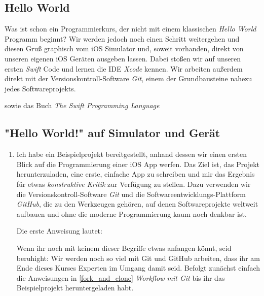 \documentclass[parskip=half, final]{scrreprt}
\begin{document}
\begin{lecture} %


\chapter{Hello World}

Was ist schon ein Programmierkurs, der nicht mit einem klassischen \emph{Hello World} Programm beginnt? Wir werden jedoch noch einen Schritt weitergehen und diesen Gruß graphisch vom iOS Simulator und, soweit vorhanden, direkt von unseren eigenen iOS Geräten ausgeben lassen. Dabei stoßen wir auf unseren ersten \emph{Swift} Code und lernen die IDE \emph{Xcode} kennen. Wir arbeiten außerdem direkt mit der Versionskontroll-Software \emph{Git}, einem der Grundbausteine nahezu jedes Softwareprojekts.

 sowie das Buch \emph{The Swift Programming Language} 


\section{"{}Hello World!"{} auf Simulator und Gerät}

\begin{enumerate}

\item Ich habe ein Beispielprojekt bereitgestellt, anhand dessen wir einen ersten Blick auf die Programmierung einer iOS App werfen. Das Ziel ist, das Projekt herunterzuladen, eine erste, einfache App zu schreiben und mir das Ergebnis für etwas \emph{konstruktive Kritik} zur Verfügung zu stellen. Dazu verwenden wir die Versionskontroll-Software \emph{Git} und die Softwareentwicklungs-Plattform \emph{GitHub}, die zu den Werkzeugen gehören, auf denen Softwareprojekte weltweit aufbauen und ohne die moderne Programmierung kaum noch denkbar ist.

Die erste Anweisung lautet:


Wenn ihr noch mit keinem dieser Begriffe etwas anfangen könnt, seid beruhight: Wir werden noch so viel mit Git und GitHub arbeiten, dass ihr am Ende dieses Kurses Experten im Umgang damit seid. Befolgt zunächst einfach die Anweisungen in \autoref{fork_and_clone} \emph{Workflow mit Git} bis ihr das Beispielprojekt heruntergeladen habt.


\end{enumerate}
\end{lecture}
\end{document}
